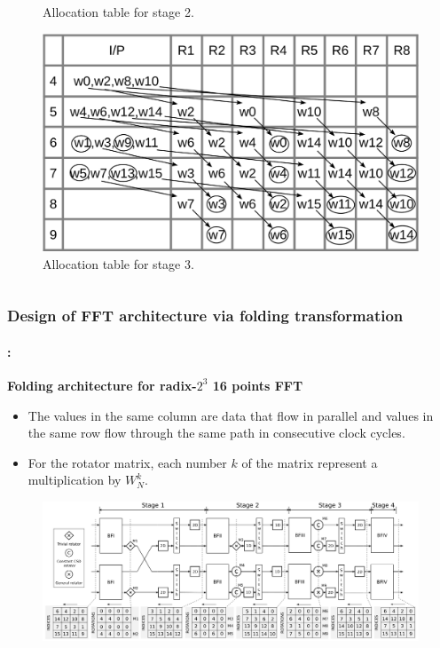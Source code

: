 \begin{frame}
\begin{columns}[t,onlytextwidth]
\begin{column}{0.45\linewidth}
\begin{figure}[h!]
	    		\caption{\footnotesize Allocation table for stage 2.}
	    	\end{figure}
	    	\vspace{-0.75cm}
	    	\begin{figure}[h!] \centering
	    		\includegraphics[height=0.30\paperheight]{./image/tab-life-c.png}
	    		\caption{\footnotesize Allocation table for stage 3.}
	    	\end{figure}  
   		\end{column}
	\end{columns}
\end{frame}

\begin{frame}
	\frametitle{\textbf{Design of FFT architecture via folding transformation}}
	\framesubtitle{\secname : \subsecname}
	\begin{block}{\centering \textbf{Folding architecture for radix-$2^3$ 16 points FFT}}
		\begin{itemize}\justifying\footnotesize
        	\item The values in the same column are data that flow in parallel and values in the same row flow through the same path in consecutive clock cycles. 
			\item For the rotator matrix, each number $k$ of the matrix represent a multiplication by $W^k_N$.
       	\end{itemize}
	\end{block}
		\vspace{-0.15cm}
		\begin{figure}[h!] \centering
		   	\includegraphics[width=0.875\paperwidth]{./image/folding-16.png}
		\end{figure}  
\end{frame}

